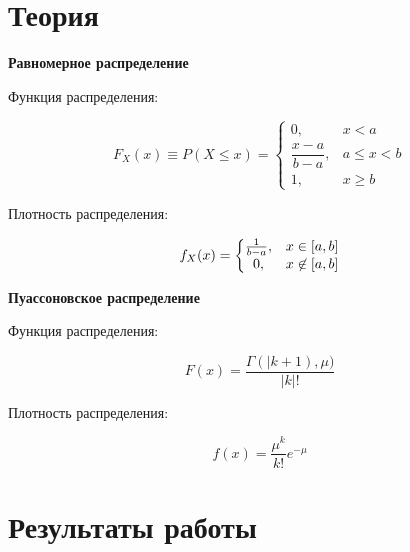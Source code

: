 \documentclass[14pt, a4paper]{extarticle}
\begin{document}
	
	\section{Теория}
	
	\textbf{Равномерное распределение }
		
	Функция распределения:
	
	\begin{equation*}
		F_X(x) \equiv P(X \le x) = \left\{
		\begin{matrix}
			0, & x < a \\
			\dfrac{x-a}{b-a}, & a \le x < b \\
			1, & x \ge b
		\end{matrix}
		\right.
	\end{equation*}

	Плотность распределения:
	
	\begin{equation*}
		f_X(x) = \left\{
		\begin{matrix}
			{1 \over b-a}, & x\in [a,b] \\
			0, & x\not\in [a,b]
		\end{matrix}
		\right.
	\end{equation*}
	
	
	\textbf{Пуассоновское распределение}
	
	Функция распределения:
	
	\begin{equation*}
		F(x) =  \frac{\Gamma(|k + 1), \mu)}{|k|!}
	\end{equation*}

	Плотность распределения:
	
	\begin{equation*}
		f(x) = \frac{\mu^{k}}{k!} e^{-\mu} 
	\end{equation*}	
	\newpage
	
	\section{Результаты работы}
	
\end{document}
